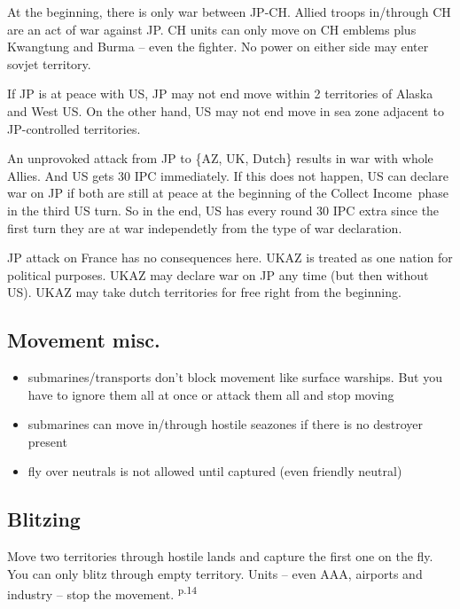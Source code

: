 \documentclass[10pt,twoside]{article}
\begin{document}
\begin{multicols*}{3}
At the beginning, there is only war between JP-CH. Allied troops in/through CH are an act of war against JP. CH units can only move on CH emblems plus Kwangtung and Burma -- even the fighter. No power on either side may enter sovjet territory.

If JP is at peace with US, JP may not end move within 2 territories of Alaska and West US. On the other hand, US may not end move in sea zone adjacent to JP-controlled territories. 

An unprovoked attack from JP to \{AZ, UK, Dutch\} results in war with whole Allies. And US gets 30 IPC immediately. If this does not happen, US can declare war on JP if both are still at peace at the beginning of the \glqq Collect Income\grqq\ phase in the third US turn. So in the end, US has every round 30 IPC extra since the first turn they are at war independetly from the type of war declaration.

JP attack on France has no consequences here. UKAZ is treated as one nation for political purposes. UKAZ may declare war on JP any time (but then without US).
UKAZ may take dutch territories for free right from the beginning.


\subsection*{Movement misc.}
\begin{itemize}
\item submarines/transports don't block movement like surface warships. But you have to ignore them all at once or attack them all and stop moving
\item submarines can move in/through hostile seazones if there is no destroyer present
\item fly over neutrals is not allowed until captured (even friendly neutral)
\end{itemize}

\subsection*{Blitzing}
Move two territories through hostile lands and capture the first one on the fly. You can only blitz through empty territory. Units -- even AAA, airports and industry -- stop the movement. \textsuperscript{p.14}


\end{multicols*}
\end{document}
